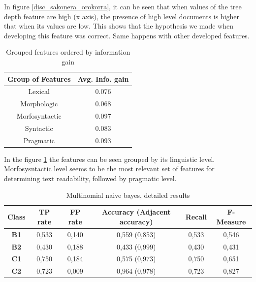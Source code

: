 \documentclass{acm_proc_article-sp}
\begin{document}
In figure \ref{disc_sakonera_orokorra}, it can be seen that when values of the tree depth feature are high (x axis), the presence of high level documents is higher that when its values are low. This shows that the hypothesis we made when developing this feature was correct. Same happens with other developed features.

\begin{table}
 \begin{center}
 \begin{tabular}{|c|c|}\hline
  {\bf Group of Features} & { \bf Avg. Info. gain } \\ \hline
 	Lexical &  0.076 \\ \hline
    Morphologic & 0.068 \\ \hline
    Morfosyntactic & 0.097 \\ \hline
    Syntactic & 0.083 \\ \hline
    Pragmatic & 0.093 \\ \hline
 
 
 \end{tabular}
 \end{center}
 \caption{Grouped features ordered by information gain}
 \label{tab:IGmultzokatuaOrokorra}
\end{table}
In the figure \ref{tab:IGmultzokatuaOrokorra} the features can be seen grouped by its linguistic level. Morfosysntactic level seems to be the most relevant set of features for determining text readability, followed by pragmatic level. 


\begin{table}
 \begin{center}
 \begin{tabular}{|c|c|c|c|c|c|}\hline

 {\bf Class }     &{\bf TP rate}   & {\bf FP rate} & {\bf Accuracy (Adjacent accuracy)} & {\bf Recall}  &  {\bf F-Measure}   \\ \hline
 {\bf B1   }       &      0,533     &  0,140        &  0,559 (0,853)          &  0,533        &   0,546            \\ \hline
 {\bf B2   }       &      0,430     &  0,188        &  0,433 (0,999)          &  0,430        &   0,431            \\ \hline
 {\bf C1   }       &      0,750     &  0,184        &  0,575 (0,973)          &  0,750        &   0,651            \\ \hline
 {\bf C2   }       &      0,723     &  0,009        &  0,964 (0,978)          &  0,723        &   0,827            \\ \hline

  
 \end{tabular}
 \end{center}
 \caption{Multinomial naive bayes, detailed results}
 \label{tab:aukeratuaestatistikak}
\end{table} 
\end{document}
